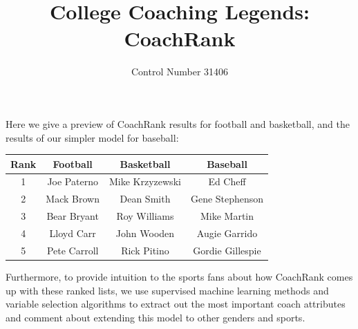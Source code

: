 \documentclass[11pt,notitlepage]{article}
\begin{document}
Here we give a preview of CoachRank results for football and basketball, and the results of our simpler model for baseball:
\begin{center}
\begin{tabular}{c | c | c | c}
Rank & Football & Basketball & Baseball\\\hline
1 & Joe Paterno  & Mike Krzyzewski & Ed Cheff \\
2 & Mack Brown   & Dean Smith      & Gene Stephenson\\
3 & Bear Bryant  & Roy Williams    & Mike Martin\\
4 & Lloyd Carr   & John Wooden     & Augie Garrido\\
5 & Pete Carroll & Rick Pitino     & Gordie Gillespie\\
\end{tabular}
\end{center}

\vspace{2 mm}

Furthermore, to provide intuition to the sports fans about how CoachRank comes up with these ranked lists, we use supervised machine learning methods and variable selection algorithms to extract out the most important coach attributes and comment about extending this model to other genders and sports.

\pagestyle{fancyplain}
\fancyhf{}
\setlength{\headsep}{0.2in} 

\title{College Coaching Legends: CoachRank}
\author{Control Number 31406}
\maketitle
\end{document}
